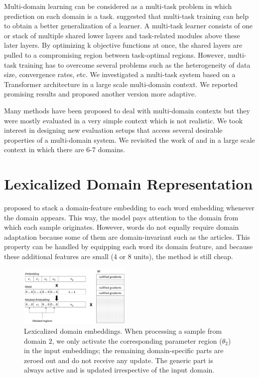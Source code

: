 \documentclass[12pt,a4paper,twoside]{report}
\theoremstyle{definition}
\begin{document}
Multi-domain learning can be considered as a multi-task problem in which prediction on each domain is a task. \cite{Caruana97multitask} suggested that multi-task training can help to obtain a better generalization of a learner. A multi-task learner consists of one or stack of multiple shared lower layers and task-related modules above these later layers. By optimizing k objective functions at once, the shared layers are pulled to a compromising region between task-optimal regions. However, multi-task training has to overcome several problems such as the heterogeneity of data size, convergence rates, etc. We investigated a multi-task system based on a Transformer architecture \cite{Vaswani17attention} in a large scale multi-domain context. We reported promising results and proposed another version more adaptive. 


Many methods have been proposed to deal with multi-domain contexts but they were mostly evaluated in a very simple context which is not realistic. We took interest in designing new evaluation setups that access several desirable properties of a multi-domain system. We revisited the work of \cite{Britz17effective} \cite{Zheng18multi} \cite{Kobus17domain} and \cite{bapna19simple} in a large scale context in which there are 6-7 domains.

\section*{Lexicalized Domain Representation}
\cite{Kobus17domain} proposed to stack a domain-feature embedding to each word embedding whenever the domain appears. This way, the model pays attention to the domain from which each sample originates. However, words do not equally require domain adaptation because some of them are domain-invariant such as the articles. This property can
be handled by equipping each word its domain feature, and because these additional features are small (4 or 8 units), the method is still cheap.
\begin{figure}[h!]
  \center
  \includegraphics[width=0.48\textwidth]{embeddings}
  \caption{Lexicalized domain embeddings. When processing a sample from domain $2$, we only activate the corresponding parameter region ($\theta_2$) in the input embeddings; the remaining domain-specific parts are zeroed out and do not receive any update. The generic part is always active and is updated irrespective of the input domain.} 
  \label{fig:network}
\end{figure}
\end{document}

